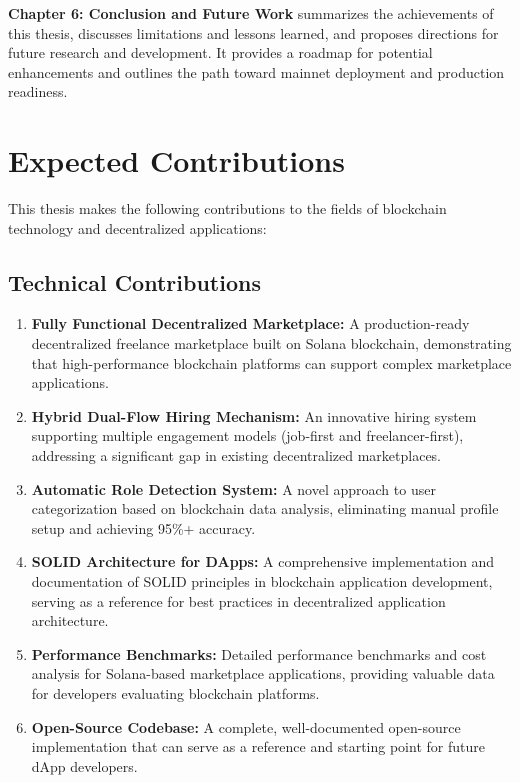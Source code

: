 \documentclass[a4paper,13pt,twoside]{report}
\theoremstyle{definition}
\begin{document}
\textbf{Chapter 6: Conclusion and Future Work} summarizes the achievements of this thesis, discusses limitations and lessons learned, and proposes directions for future research and development. It provides a roadmap for potential enhancements and outlines the path toward mainnet deployment and production readiness.

\section{Expected Contributions}

This thesis makes the following contributions to the fields of blockchain technology and decentralized applications:

\subsection{Technical Contributions}

\begin{enumerate}
    \item \textbf{Fully Functional Decentralized Marketplace:} A production-ready decentralized freelance marketplace built on Solana blockchain, demonstrating that high-performance blockchain platforms can support complex marketplace applications.

    \item \textbf{Hybrid Dual-Flow Hiring Mechanism:} An innovative hiring system supporting multiple engagement models (job-first and freelancer-first), addressing a significant gap in existing decentralized marketplaces.

    \item \textbf{Automatic Role Detection System:} A novel approach to user categorization based on blockchain data analysis, eliminating manual profile setup and achieving 95\%+ accuracy.

    \item \textbf{SOLID Architecture for DApps:} A comprehensive implementation and documentation of SOLID principles in blockchain application development, serving as a reference for best practices in decentralized application architecture.

    \item \textbf{Performance Benchmarks:} Detailed performance benchmarks and cost analysis for Solana-based marketplace applications, providing valuable data for developers evaluating blockchain platforms.

    \item \textbf{Open-Source Codebase:} A complete, well-documented open-source implementation that can serve as a reference and starting point for future dApp developers.
\end{enumerate}
\end{document}

